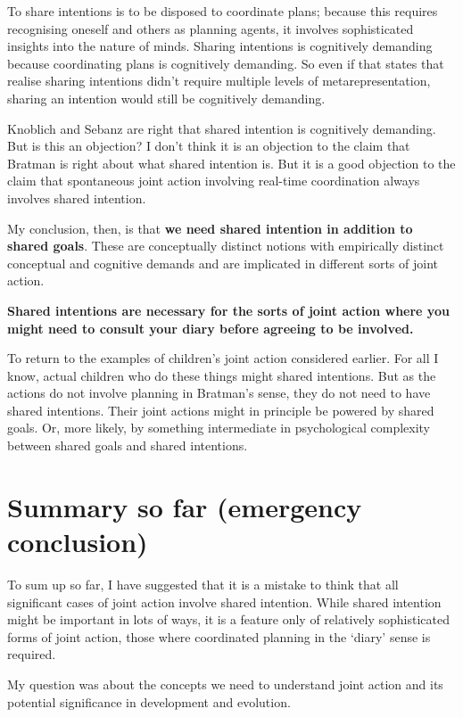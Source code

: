 \documentclass[14pt,a4paper]{extarticle}
\begin{document}
To share intentions is to be disposed to coordinate plans; because this requires recognising oneself and others as planning agents, it involves sophisticated insights into the nature of minds.  
Sharing intentions is cognitively demanding because coordinating plans is cognitively demanding.
So even if that states that realise sharing intentions didn’t require multiple levels of metarepresentation, sharing an intention would still be cognitively demanding.

Knoblich and Sebanz are right that shared intention is cognitively demanding.  But is this an objection?  I don't think it is an objection to the claim that Bratman is right about what shared intention is.  But it is a good objection to the claim that spontaneous joint action involving real-time coordination always involves shared intention.

My conclusion, then, is that \textbf{we need shared intention in addition to shared goals}.  These are conceptually distinct notions with empirically distinct conceptual and cognitive demands and are implicated in different sorts of joint action.

\textbf{Shared intentions are necessary for the sorts of joint action where you might need to consult your diary before agreeing to be involved.}

To return to the examples of children's joint action considered earlier.  For all I know, actual children who do these things might shared intentions.  But as the actions do not involve planning in Bratman's sense, they do not need to have shared intentions.  Their joint actions might in principle be powered by shared goals.
Or, more likely, by something intermediate in psychological complexity between shared goals and shared intentions.



\section{Summary so far (emergency conclusion)}

To sum up so far, I have suggested that it is a mistake to think that all significant cases of joint action involve shared intention.  
While shared intention might be important in lots of ways, it is a feature only of relatively sophisticated forms of joint action, those where coordinated planning in the `diary' sense is required.

My question was about the concepts we need to understand joint action and its potential significance in development and evolution.
\end{document}
